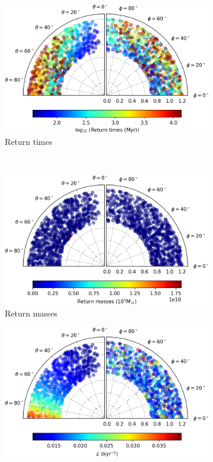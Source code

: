 \begin{figure}[h]
    \centering
    \begin{subfigure}[t]{0.4\textwidth}
        \includegraphics[width = \textwidth]{"../Files/Week 13/images/18_time"}
        \caption{Return times}
    \end{subfigure}
    ~ 
    \begin{subfigure}[t]{0.4\textwidth}
        \includegraphics[width=\textwidth]{"../Files/Week 13/images/18_mass"}
        \caption{Return masses}
    \end{subfigure}
    \begin{subfigure}[t]{0.4\textwidth}
        \includegraphics[width=\textwidth]{"../Files/Week 13/images/18_lyapunov"}

\end{subfigure}
\end{figure}
